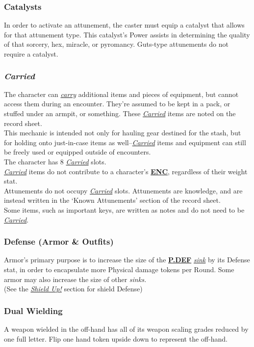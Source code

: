 \documentclass[12pt]{article}
\newcommand{\refto}[1]{\hyperlink{#1}{\textbf{#1}}}
\newcommand{\reftoit}[1]{\hyperlink{#1}{\emph{#1}}}
\begin{document}
\begin{multicols*}{2}
\subsubsection{Catalysts}
In order to activate an attunement, the caster must equip a catalyst that allows for that attunement type. This catalyst’s Power assists in determining the quality of that sorcery, hex, miracle, or pyromancy. Guts-type attunements do not require a catalyst.

\subsubsection{\emph{Carried}}
\hypertarget{Carried}{}\hypertarget{carried}{}\hypertarget{carry}{}
The character can \reftoit{carry} additional items and pieces of equipment, but cannot access them during an encounter. They’re assumed to be kept in a pack, or stuffed under an armpit, or something. These \reftoit{Carried} items are noted on the record sheet.\\
This mechanic is intended not only for hauling gear destined for the stash, but for holding onto just-in-case items as well--\reftoit{Carried} items and equipment can still be freely used or equipped outside of encounters.\\
The character has 8 \reftoit{Carried} slots.\\
\reftoit{Carried} items do not contribute to a character’s \refto{ENC}, regardless of their weight stat.\\
Attunements do not occupy \reftoit{Carried} slots. Attunements are knowledge, and are instead written in the ‘Known Attunements’ section of the record sheet.\\
Some items, such as important keys, are written as notes and do not need to be \reftoit{Carried}.

\subsubsection{Defense (Armor \& Outfits)}
Armor’s primary purpose is to increase the size of the \refto{P.DEF} \reftoit{sink} by its Defense stat, in order to encapsulate more Physical damage tokens per Round. Some armor may also increase the size of other \emph{sinks.}\\
(See the \reftoit{Shield Up!} section for shield Defense)

\subsubsection{Dual Wielding}
A weapon wielded in the off-hand has all of its weapon scaling grades reduced by one full letter. Flip one hand token upside down to represent the off-hand.


\end{multicols*}
\end{document}
